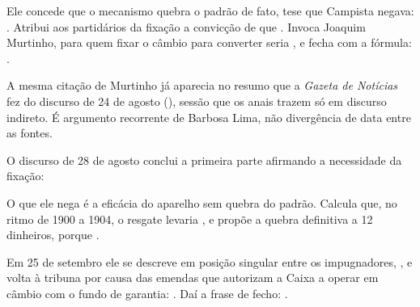 
Ele concede que o mecanismo quebra o padrão de fato, tese que Campista negava:
 . Atribui aos partidários da fixação a
convicção de que  . Invoca
Joaquim Murtinho, para quem fixar o câmbio para converter seria
 , e fecha com
a fórmula:  .

A mesma citação de Murtinho já aparecia no resumo que a \textit{Gazeta de
Notícias} fez do discurso de 24 de agosto (), sessão que os anais trazem só em discurso
indireto. É argumento recorrente de Barbosa Lima, não divergência de data entre
as fontes.


O discurso de 28 de agosto conclui a primeira parte afirmando a necessidade da
fixação:


O que ele nega é a eficácia do aparelho sem quebra do padrão. Calcula que, no
ritmo de 1900 a 1904, o resgate levaria 
, e propõe a quebra definitiva a 12 dinheiros, porque
 .

Em 25 de setembro ele se descreve em posição singular entre os impugnadores,
 ,
e volta à tribuna por causa das emendas que autorizam a Caixa a operar em
câmbio com o fundo de garantia: 
. Daí a frase de fecho:  .


